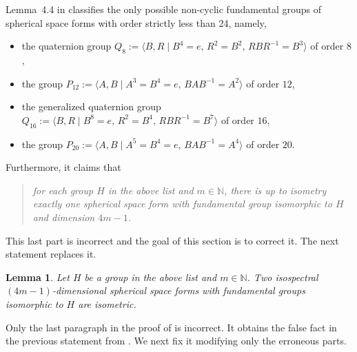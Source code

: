\documentclass[12pt,a4paper,final]{amsart}
\theoremstyle{plain}
\newtheorem{lemma}[theorem]{Lemma}
\theoremstyle{definition}
\theoremstyle{remark}
\numberwithin{equation}{section}
\newcommand{\N}{\mathbb N}
\begin{document}
Lemma~4.4 in \cite{LauretLinowitz} classifies the only possible non-cyclic fundamental groups of spherical space forms with order strictly less than 24, namely,
\begin{itemize}
\item the quaternion group $Q_8:=\langle B,R\mid B^4=e,\, R^2=B^2,\, RBR^{-1}=B^3\rangle$ of order $8$,

\item the group $P_{12}:=\langle A,B\mid A^3=B^4=e,\, BAB^{-1}=A^2\rangle$ of order $12$,

\item the generalized quaternion group $Q_{16}:=\langle B,R\mid B^8=e,\, R^2=B^4,\, RBR^{-1}=B^7\rangle$ of order $16$,

\item the group $P_{20}:=\langle A,B\mid A^5=B^4=e,\, BAB^{-1}=A^4\rangle$ of order $20$. 
\end{itemize}
Furthermore, it claims that 
\begin{quote}
\it for each group $H$ in the above list and $m\in\N$, there is up to isometry exactly one spherical space form with fundamental group isomorphic to $H$ and dimension $4m-1$.
\end{quote}
This last part is incorrect and the goal of this section is to correct it. 
The next statement replaces it. 

\begin{lemma}\label{lem:errata}
Let $H$ be a group in the above list and $m\in\N$.  Two isospectral $(4m-1)$-dimensional spherical space forms with fundamental groups isomorphic to $H$ are isometric. 
\end{lemma}

Only the last paragraph in the proof of \cite[Lem.~4.4]{LauretLinowitz} is incorrect. 
It obtains the false fact in the previous statement from \cite[Prop.~5.3]{Wolf01}. 
We next fix it modifying only the erroneous parts.  
\end{document}
